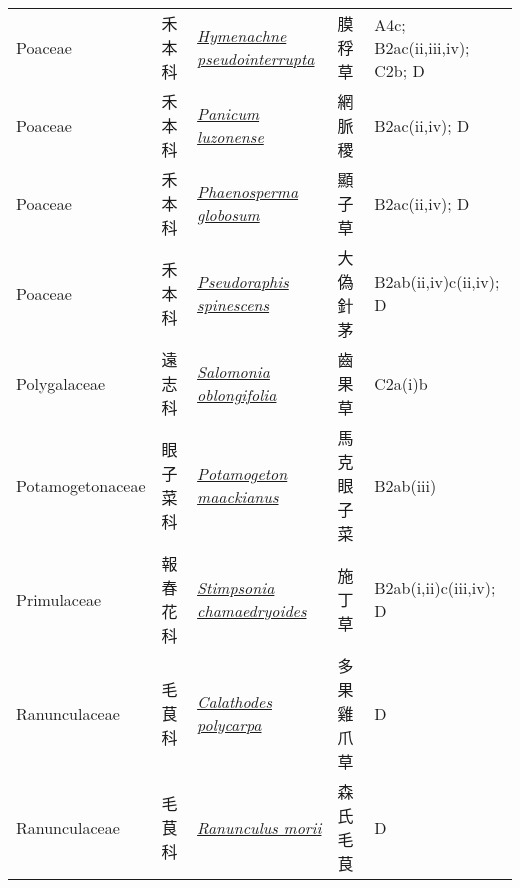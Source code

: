 {\begin{longtable}{p{2.5cm}p{2.5cm}p{4.5cm}p{2.5cm}p{3cm}}
    Poaceae & 禾本科 & \href{http://www.theplantlist.org/tpl1.1/search?q=Hymenachne+pseudointerrupta}{\textit{Hymenachne pseudointerrupta} } & 膜稃草 & A4c; B2ac(ii,iii,iv); C2b; D \index{Hymenachne@\textit{Hymenachne}!pseudointerrupta@\textit{pseudointerrupta}}  \index{膜稃草} \\
    Poaceae & 禾本科 & \href{http://www.theplantlist.org/tpl1.1/search?q=Panicum+luzonense}{\textit{Panicum luzonense} } & 網脈稷 & B2ac(ii,iv); D \index{Panicum@\textit{Panicum}!luzonense@\textit{luzonense}}  \index{網脈稷} \\
    Poaceae & 禾本科 & \href{http://www.theplantlist.org/tpl1.1/search?q=Phaenosperma+globosum}{\textit{Phaenosperma globosum} } & 顯子草 & B2ac(ii,iv); D \index{Phaenosperma@\textit{Phaenosperma}!globosum@\textit{globosum}}  \index{顯子草} \\
    Poaceae & 禾本科 & \href{http://www.theplantlist.org/tpl1.1/search?q=Pseudoraphis+spinescens}{\textit{Pseudoraphis spinescens} } & 大偽針茅 & B2ab(ii,iv)c(ii,iv); D \index{Pseudoraphis@\textit{Pseudoraphis}!spinescens@\textit{spinescens}}  \index{大偽針茅} \\
    Polygalaceae & 遠志科 & \href{http://www.theplantlist.org/tpl1.1/search?q=Salomonia+oblongifolia}{\textit{Salomonia oblongifolia} } & 齒果草 & C2a(i)b \index{Salomonia@\textit{Salomonia}!oblongifolia@\textit{oblongifolia}}  \index{齒果草} \\
    Potamogetonaceae & 眼子菜科 & \href{http://www.theplantlist.org/tpl1.1/search?q=Potamogeton+maackianus}{\textit{Potamogeton maackianus} } & 馬克眼子菜 & B2ab(iii) \index{Potamogeton@\textit{Potamogeton}!maackianus@\textit{maackianus}}  \index{馬克眼子菜} \\
    Primulaceae & 報春花科 & \href{http://www.theplantlist.org/tpl1.1/search?q=Stimpsonia+chamaedryoides}{\textit{Stimpsonia chamaedryoides} } & 施丁草 & B2ab(i,ii)c(iii,iv); D \index{Stimpsonia@\textit{Stimpsonia}!chamaedryoides@\textit{chamaedryoides}}  \index{施丁草} \\
    Ranunculaceae & 毛茛科 & \href{http://www.theplantlist.org/tpl1.1/search?q=Calathodes+polycarpa}{\textit{Calathodes polycarpa} } & 多果雞爪草 & D \index{Calathodes@\textit{Calathodes}!polycarpa@\textit{polycarpa}}  \index{多果雞爪草} \\
    Ranunculaceae & 毛茛科 & \href{http://www.theplantlist.org/tpl1.1/search?q=Ranunculus+morii}{\textit{Ranunculus morii} } & 森氏毛茛 & D \index{Ranunculus@\textit{Ranunculus}!morii@\textit{morii}}  \index{森氏毛茛} \\

\end{longtable}}
